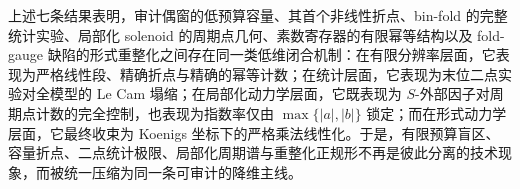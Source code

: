 \noindent
上述七条结果表明，审计偶窗的低预算容量、其首个非线性折点、bin-fold 的完整统计实验、局部化 solenoid 的周期点几何、素数寄存器的有限幂等结构以及 fold-gauge 缺陷的形式重整化之间存在同一类低维闭合机制：在有限分辨率层面，它表现为严格线性段、精确折点与精确的幂等计数；在统计层面，它表现为末位二点实验对全模型的 Le Cam 塌缩；在局部化动力学层面，它既表现为 \(S\)-外部因子对周期点计数的完全控制，也表现为指数率仅由 \(\max\{|a|,|b|\}\) 锁定；而在形式动力学层面，它最终收束为 Koenigs 坐标下的严格乘法线性化。于是，有限预算盲区、容量折点、二点统计极限、局部化周期谱与重整化正规形不再是彼此分离的技术现象，而被统一压缩为同一条可审计的降维主线。







\endinput
